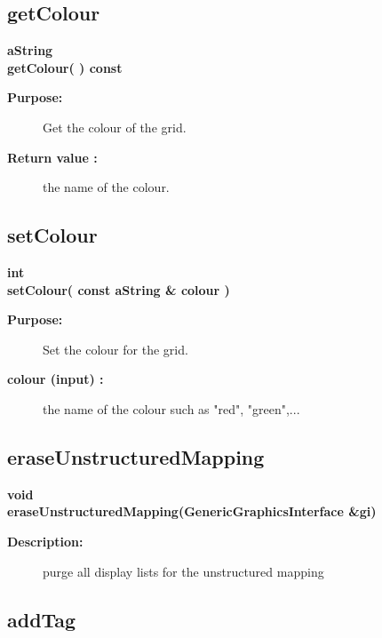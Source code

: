 \subsection{getColour}
 
\newlength{\UnstructuredMappingIncludeArgIndent}
\begin{flushleft} \textbf{%
aString  \\ 
\settowidth{\UnstructuredMappingIncludeArgIndent}{getColour(}%
getColour( ) const
}\end{flushleft}
\begin{description}
\item[{\bf Purpose:}]  
    Get the colour of the grid.
\item[{\bf Return value :}]  the name of the colour.
\end{description}
\subsection{setColour}
 
\begin{flushleft} \textbf{%
int  \\ 
\settowidth{\UnstructuredMappingIncludeArgIndent}{setColour(}%
setColour( const aString \& colour )
}\end{flushleft}
\begin{description}
\item[{\bf Purpose:}]  
    Set the colour for the grid.
\item[{\bf colour (input) :}]  the name of the colour such as "red", "green",...
\end{description}
\subsection{eraseUnstructuredMapping}
 
\begin{flushleft} \textbf{%
void  \\ 
\settowidth{\UnstructuredMappingIncludeArgIndent}{eraseUnstructuredMapping(}%
eraseUnstructuredMapping(GenericGraphicsInterface \&gi)
}\end{flushleft}
\begin{description}
\item[{\bf Description:}] 
   purge all display lists for the unstructured mapping
\end{description}
\subsection{addTag}
 
